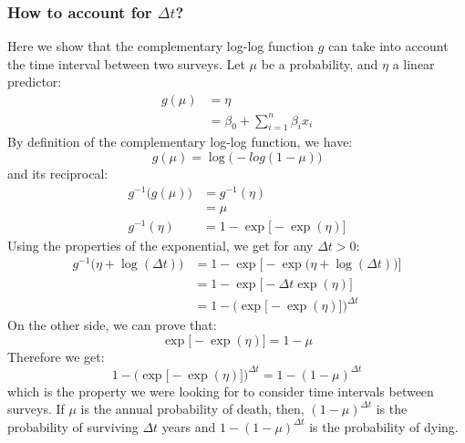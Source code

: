 \documentclass[letterpaper, 12pt]{article}
\theoremstyle{theo}
\begin{document}
\begin{refsection}
\begin{onehalfspace}
\subsubsection{How to account for $ \Delta t $?}
Here we show that the complementary log-log function $ g $ can take into account the time interval between two surveys. Let $ \mu $ be a probability, and $ \eta $ a linear predictor:
\begin{align*}
	g(\mu) &= \eta \\
		&= \beta_0 + \sum_{i = 1}^{n} \beta_i x_i
\end{align*}
By definition of the complementary log-log function, we have:
\[
	g(\mu) = \log \big( -log(1 - \mu) \big)
\]
and its reciprocal:
\begin{align*}
	g^{-1} \big( g(\mu) \big) &= g^{-1}(\eta) \\
		&= \mu \\
	g^{-1}(\eta) &= 1 - \exp \big[ -\exp(\eta) \big]
\end{align*}
Using the properties of the exponential, we get for any $ \Delta t > 0 $:
\begin{align*}
	g^{-1} \big( \eta + \log(\Delta t) \big) &= 1 - \exp \Big[ -\exp \big(\eta + \log(\Delta t)\big) \Big] \\
		&= 1 - \exp \big[ - \Delta t \exp (\eta) \big] \\
		&= 1 - \Big( \exp \big[ -\exp (\eta) \big] \Big)^{\Delta t}
\end{align*}
On the other side, we can prove that:
\[
	\exp \big[ -\exp (\eta) \big] = 1 - \mu
\]
Therefore we get:
\begin{equation}
	1 - \Big( \exp \big[ -\exp (\eta) \big] \Big)^{\Delta t} = 1 - (1 - \mu)^{\Delta t}
\end{equation}
which is the property we were looking for to consider time intervals between surveys. If $ \mu $ is the annual probability of death, then, $ (1 - \mu)^{\Delta t} $ is the probability of surviving $ \Delta t $ years and $ 1 - (1 - \mu)^{\Delta t} $ is the probability of dying.


\end{onehalfspace}
\end{refsection}
\end{document}

